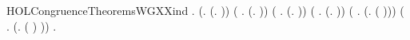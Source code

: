 \begin{SaveVerbatim}{HOLCongruenceTheoremsWGXXind}
\HOLTokenTurnstile{} \HOLSymConst{\HOLTokenForall{}}.
       (\HOLSymConst{\HOLTokenForall{}}.  (\HOLTokenLambda{}. )) \HOLSymConst{\HOLTokenConj{}}
       (\HOLSymConst{\HOLTokenForall{}} .   \HOLSymConst{\HOLTokenImp{}}  (\HOLTokenLambda{}.  )) \HOLSymConst{\HOLTokenConj{}}
       (\HOLSymConst{\HOLTokenForall{}} .   \HOLSymConst{\HOLTokenConj{}}   \HOLSymConst{\HOLTokenImp{}}  (\HOLTokenLambda{}.   \HOLSymConst{\ensuremath{+}}  )) \HOLSymConst{\HOLTokenConj{}}
       (\HOLSymConst{\HOLTokenForall{}} .   \HOLSymConst{\HOLTokenConj{}}   \HOLSymConst{\HOLTokenImp{}}  (\HOLTokenLambda{}.   \HOLSymConst{\ensuremath{\parallel}}  )) \HOLSymConst{\HOLTokenConj{}}
       (\HOLSymConst{\HOLTokenForall{}} .   \HOLSymConst{\HOLTokenImp{}}  (\HOLTokenLambda{}. \HOLConst{\ensuremath{\nu}}  ( ))) \HOLSymConst{\HOLTokenConj{}}
       (\HOLSymConst{\HOLTokenForall{}} .   \HOLSymConst{\HOLTokenImp{}}  (\HOLTokenLambda{}.  ( ) )) \HOLSymConst{\HOLTokenImp{}}
       \HOLSymConst{\HOLTokenForall{}}.   \HOLSymConst{\HOLTokenImp{}}  
\end{SaveVerbatim}
\newcommand{\HOLCongruenceTheoremsWGXXind}{\UseVerbatim{HOLCongruenceTheoremsWGXXind}}
